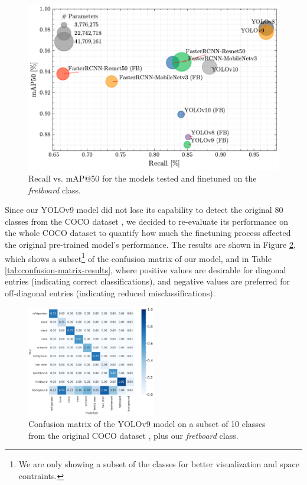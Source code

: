 \documentclass[10pt,twocolumn,letterpaper]{article}
\begin{document}
\begin{figure}[thb]
    \centering
    \includegraphics[width=\columnwidth]{images/final/recall_vs_map50.pdf}
    \caption{Recall vs. mAP@50 for the models tested and finetuned on the \emph{fretboard} class.}
    \label{fig:fretboard-models-recall-map}
\end{figure}

Since our YOLOv9 model did not lose its capability to detect the original 80 classes from the COCO dataset \cite{lin2015microsoftcococommonobjects}, we decided to re-evaluate its performance on the whole COCO dataset to quantify how much the finetuning process affected the original pre-trained model's performance. The results are shown in Figure \ref{fig:yolo-diff-confusion-matrix}, which shows a subset\footnote{We are only showing a subset of the classes for better visualization and space contraints.} of the confusion matrix of our model, and in Table \ref{tab:confusion-matrix-results}, where positive values are desirable for diagonal entries (indicating correct classifications), and negative values are preferred for off-diagonal entries (indicating reduced misclassifications).

\begin{figure}[h]
    \centering
    \includegraphics[width=0.5\textwidth]{images/final/yolo_confusion_matrix_subset.pdf}
    \caption{Confusion matrix of the YOLOv9 model on a subset of 10 classes from the original COCO dataset \cite{lin2015microsoftcococommonobjects}, plus our \emph{fretboard} class.}
    \label{fig:yolo-diff-confusion-matrix}
\end{figure}
\end{document}
